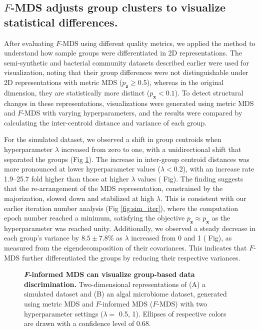 \documentclass[10pt,letterpaper]{article}
\newcommand{\1}{{\rm 1}\kern-0.24em{\rm I}}
\begin{document}
\subsection*{$F$-MDS adjusts group clusters to visualize statistical differences.} \label{sec:vis_fmds}
After evaluating $F$-MDS using different quality metrics, we applied the method to understand how sample groups were differentiated in 2D representations. The semi-synthetic and bacterial community datasets described earlier were used for visualization, noting that their group differences were not distinguishable under 2D representations with metric MDS ($p_\mathbf{z}\geq 0.5$), whereas in the original dimension, they are statistically more distinct ($p_\mathbf{x}<0.1$). To detect structural changes in these representations, visualizations were generated using metric MDS and $F$-MDS with varying hyperparameters, and the results were compared by calculating the inter-centroid distance and variance of each group.

For the simulated dataset, we observed a shift in group centroids when hyperparameter $\lambda$ increased from zero to one, with a unidirectional shift that separated the groups (Fig \ref{fig:vis}). The increase in inter-group centroid distances was more pronounced at lower hyperparameter values ($\lambda < 0.2$), with an increase rate 1.9--25.7 fold higher than those at higher $\lambda$ values ( Fig). The finding suggests that the re-arrangement of the MDS representation, constrained by the majorization, slowed down and stabilized at high $\lambda$. This is consistent with our earlier iteration number analysis (Fig \ref{fig:sim_iter}), where the computation epoch number reached a minimum, satisfying the objective $p_\mathbf{z}\approx p_\mathbf{x}$ as the hyperparameter was reached unity. Additionally, we observed a steady decrease in each group's variance by $8.5\pm7.8\%$ as $\lambda$ increased from 0 and 1 ( Fig), as measured from the eigendecomposition of their covariances. This indicates that $F$-MDS further differentiated the groups by reducing their respective variances. 


\begin{figure}[h!]
    \centering
    \caption{\textbf{\textit{F}-informed MDS can visualize group-based data discrimination.} Two-dimensional representations of (A) a simulated dataset and (B) an algal microbiome dataset, generated using metric MDS and $F$-informed MDS ($F$-MDS) with two hyperparameter settings ($\lambda=$ 0.5, 1). Ellipses of respective colors are drawn with a confidence level of 0.68.}
    \label{fig:vis}
\end{figure}
\end{document}
